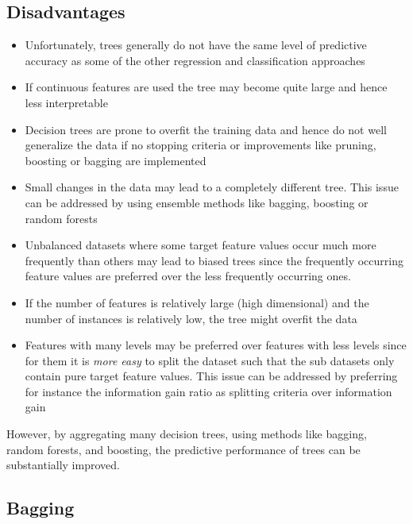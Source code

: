 \documentclass[%
oneside,                 %
final,                   %
10pt]{article}
\begin{document}
\noindent
\subsection*{Disadvantages}

\begin{itemize}
\item Unfortunately, trees generally do not have the same level of predictive accuracy as some of the other regression and classification approaches

\item If continuous features are used the tree may become quite large and hence less interpretable

\item Decision trees are prone to overfit the training data and hence do not well generalize the data if no stopping criteria or improvements like pruning, boosting or bagging are implemented

\item Small changes in the data may lead to a completely different tree. This issue can be addressed by using ensemble methods like bagging, boosting or random forests

\item Unbalanced datasets where some target feature values occur much more frequently than others may lead to biased trees since the frequently occurring feature values are preferred over the less frequently occurring ones. 

\item If the number of features is relatively large (high dimensional) and the number of instances is relatively low, the tree might overfit the data

\item Features with many levels may be preferred over features with less levels since for them it is \emph{more easy} to split the dataset such that the sub datasets only contain pure target feature values. This issue can be addressed by preferring for instance the information gain ratio as splitting criteria over information gain
\end{itemize}

\noindent
However, by aggregating many decision trees, using methods like bagging, random forests, and boosting, the predictive performance of trees can be substantially improved. 

\subsection*{Bagging}
\end{document}
